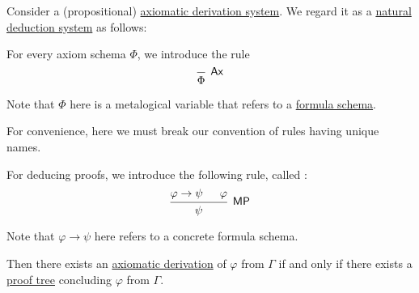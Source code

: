 \begin{proposition}\label{thm:axiomatic_derivation_as_natural_deduction}
  Consider a (propositional) \hyperref[def:axiomatic_derivation_system]{axiomatic derivation system}. We regard it as a \hyperref[def:natural_deduction_system]{natural deduction system} as follows:
  \begin{thmenum}
     For every axiom schema \( \Phi \), we introduce the rule
    \begin{equation*}
      \begin{prooftree}
        \infer0[\logic{Ax}]{ \Phi }
      \end{prooftree}
    \end{equation*}

    Note that \( \Phi \) here is a metalogical variable that refers to a \hyperref[def:propositional_formula_schema]{formula schema}.

    For convenience, here we must break our convention of rules having unique names.

     For deducing proofs, we introduce the following rule, called :
    \begin{equation*}
      \begin{prooftree}
        \hypo{ \varphi \rightarrow \psi }
        \hypo{ \varphi }
        \infer2[\logic{MP}]{ \psi }
      \end{prooftree}
    \end{equation*}

    Note that \( \varphi \rightarrow \psi \) here refers to a concrete formula schema.
  \end{thmenum}

  Then there exists an \hyperref[def:axiomatic_derivation]{axiomatic derivation} of \( \varphi \) from \( \Gamma \) if and only if there exists a \hyperref[def:natural_deduction_proof_tree]{proof tree} concluding \( \varphi \) from \( \Gamma \).
\end{proposition}


